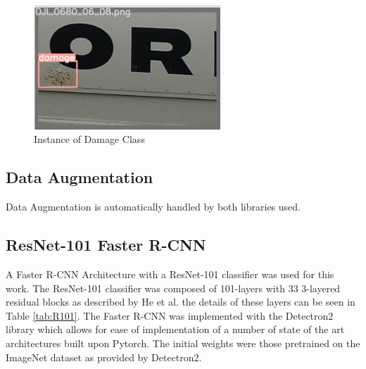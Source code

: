 \documentclass[conference]{IEEEtran}
\begin{document}
\begin{figure}[H]
    \centering
    \includegraphics[width=7cm]{Images/Damage Example.png}
    \caption{Instance of Damage Class}
    \label{fig:damageex}
\end{figure}

\subsection{Data Augmentation}
Data Augmentation is automatically handled by both libraries used.

\subsection{ResNet-101 Faster R-CNN}
A Faster R-CNN Architecture with a ResNet-101 classifier was used for this work. The ResNet-101 classifier was composed of 101-layers with 33 3-layered residual blocks as described by He et al. \cite{he2015deep} the details of these layers can be seen in Table \ref{tab:R101}. The Faster R-CNN was implemented with the Detectron2 library \cite{wu2019detectron2} which allows for ease of implementation of a number of state of the art architectures built upon Pytorch. The initial weights were those pretrained on the ImageNet dataset \cite{deng2009imagenet} as provided by Detectron2. 
\end{document}
